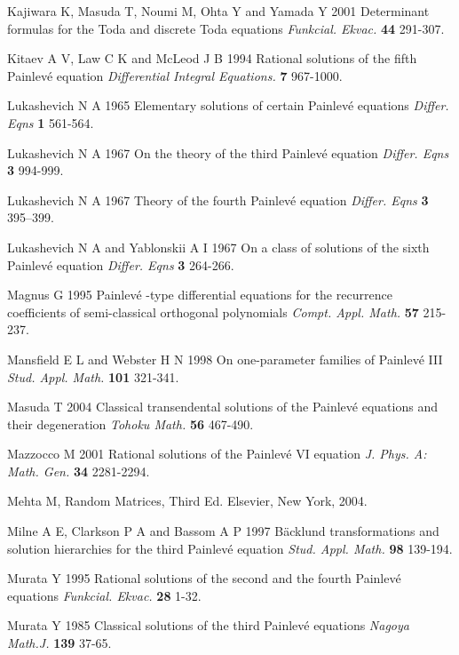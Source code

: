 \documentclass[12pt]{article}
\def\B{\rm{B\"ack\-lund }}
\def\P{Painlev\'e }
\numberwithin{figure}{section}
\numberwithin{equation}{section}
\numberwithin{table}{section}
\begin{document}
\begin{thebibliography}{9}
  {Kajiwara K, Masuda T, Noumi M, Ohta Y and Yamada Y} 2001 {Determinant formulas for the Toda and discrete Toda equations} {\it{Funkcial.
  Ekvac.}} {\bf{44}} 291-307.

  {Kitaev A V, Law C K and McLeod J B} 1994 {Rational solutions of the fifth
\P equation} {\it{Differential Integral Equations.}} {\bf{7}} 967-1000.

  {Lukashevich N A} {1965} {Elementary solutions of certain \P equations} {\it{Differ. Eqns}} {\bf{1}} 561-564.

  {Lukashevich N A} {1967} {On the theory of the third \P equation} {\it{Differ. Eqns}} {\bf{3}} 994-999.

  {Lukashevich N A} {1967} {Theory of the fourth \P equation} {\it{Differ. Eqns}} {\bf{3}} 395--399.

  {Lukashevich N A and  Yablonskii A I} {1967} {On a class of solutions of the sixth \P equation} {\it{Differ. Eqns}} {\bf{3}} 264-266.

  {Magnus G} 1995 \P-type differential equations for the recurrence coefficients of semi-classical orthogonal polynomials {\it{Compt. Appl. Math.}} {\bf{57}} 215-237.

  {Mansfield E L and Webster H N} 1998 On one-parameter families of \P III {\it{Stud. Appl. Math.}} {\bf{101}} 321-341.

  {Masuda T} 2004 {Classical transendental solutions of the Painlev\'e equations and their degeneration} {\it{Tohoku Math.}} {\bf{56}} 467-490.

  {Mazzocco M} 2001 Rational solutions of the \P VI equation {\it{J. Phys. A: Math. Gen.}} {\bf{34}} 2281-2294.

  Mehta M, Random Matrices, Third Ed. Elsevier, New York, 2004.

  {Milne A E, Clarkson P A and Bassom A P} 1997 {\B transformations and
solution hierarchies for the third \P equation} {\it{Stud. Appl. Math.}} {\bf{98}} 139-194.

{Murata Y} 1995 {Rational solutions of the second and the fourth \P equations} {\it{Funkcial. Ekvac.}} {\bf{28}} 1-32.

  {Murata Y} 1985 {Classical solutions of the third \P equations} {\it{Nagoya Math.J.}} {\bf{139}} 37-65.


\end{thebibliography}
\end{document}
